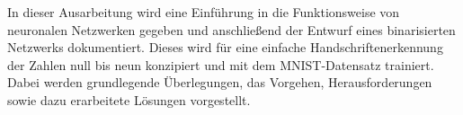 In dieser Ausarbeitung wird eine Einführung in die Funktionsweise von neuronalen
Netzwerken gegeben und anschließend der Entwurf eines binarisierten
Netzwerks dokumentiert. Dieses wird für eine einfache Handschriftenerkennung der
Zahlen null bis neun konzipiert und mit dem MNIST-Datensatz trainiert.
Dabei werden grundlegende Überlegungen, das Vorgehen, Herausforderungen
sowie dazu erarbeitete Lösungen vorgestellt.
